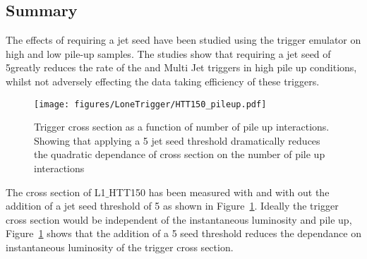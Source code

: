 
\subsection{Summary} %
\label{sec:Summary}
The effects of requiring a jet seed have been studied using the \Lone trigger 
emulator on high and low pile-up samples. The studies show that requiring a jet 
seed of 5\GeV greatly reduces the rate of the \HT and Multi Jet triggers in 
high pile up conditions, whilst not adversely effecting the data taking 
efficiency of these triggers.

\begin{figure}[ht]
  \centering
  \texttt{[image: figures/LoneTrigger/HTT150\_pileup.pdf]}
  \caption{Trigger cross section as a function of number of pile up 
  interactions. Showing that applying a 5 \GeV jet seed threshold dramatically 
  reduces the quadratic dependance of cross section on the number of pile up 
  interactions}
  \label{fig:figures_HTT150_pileup}
\end{figure}

The cross section of L1$\_$HTT150 has been measured with and with out the 
addition of a jet seed threshold of 5 \GeV as shown in  
Figure~\ref{fig:figures_HTT150_pileup}. Ideally the trigger cross section would 
be independent of the instantaneous luminosity and pile up, 
Figure~\ref{fig:figures_HTT150_pileup} shows that the addition of a 5 \GeV seed 
threshold reduces the dependance on instantaneous luminosity of the trigger 
cross section.


